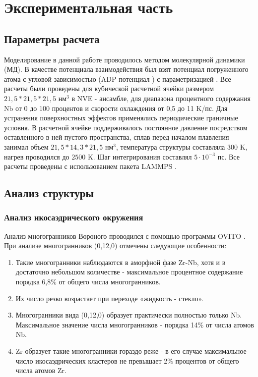 \chapter{Экспериментальная часть}
\section{Параметры расчета}
Моделирование в данной  работе проводилось методом молекулярной динамики (МД). В качестве потенциала взаимодействия был взят потенциал погруженного атома с угловой зависимостью (ADP-потенциал \cite{mishin2005phase}) с параметризацией \cite{Smirnova}. Все расчеты были проведены  для кубической расчетной ячейки размером $21,5*21,5*21,5 \text{ нм}^3$  в NVE - ансамбле, для диапазона процентного содержания  Nb от 0 до 100 процентов и скорости охлаждения от 0,5 до 11 K/пс.  Для устранения поверхностных эффектов применялись периодические граничные условия. В расчетной ячейке поддерживалось постоянное давление посредством оставленного в ней пустого пространства, сплав перед началом плавления занимал объем $21,5*14,3*21,5 \text{ нм}^3$, температура структуры составляла $300 $ K, нагрев проводился до $2500$ K. Шаг интегрирования составлял $5 \cdot10^{-3}\text{ пс}$. Все расчеты проведены с использованием пакета LAMMPS \cite{Plimpton}.
\section{Анализ структуры}
\subsection{Анализ икосаэдрического окружения}
Анализ многогранников Вороного проводился с помощью программы OVITO \cite{Stukowski}. При анализе многогранников (0,12,0) отмечены следующие особенности:
\begin{enumerate}
	\item Такие многогранники  наблюдаются в аморфной фазе Zr-Nb, хотя и в достаточно небольшом количестве - максимальное процентное содержание порядка 6,8\% от общего числа многогранников.
	\item Их число резко возрастает при переходе «жидкость - стекло».
	\item Многогранники вида (0,12,0) образует практически полностью только Nb. Максимальное значение числа многогранников - порядка 14\% от числа атомов Nb. 
	\item Zr образует такие многогранники гораздо реже - в его случае максимальное число икосаэдрических кластеров не превышает 2\% процентов от общего числа атомов Zr.
\end{enumerate}

